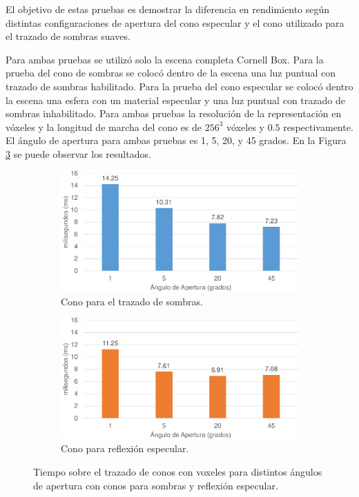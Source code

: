 El objetivo de estas pruebas es demostrar la diferencia en rendimiento según distintas configuraciones de apertura del cono especular y el cono utilizado para el trazado de sombras suaves.

Para ambas pruebas se utilizó solo la escena completa Cornell Box. Para la prueba del cono de sombras se colocó dentro de la escena una luz puntual con trazado de sombras habilitado. Para la prueba del cono especular se colocó dentro la escena una esfera con un material especular y una luz puntual con trazado de sombras inhabilitado. Para ambas pruebas la resolución de la representación en vóxeles y la longitud de marcha del cono es de $256^3$ vóxeles y $0.5$ respectivamente. El ángulo de apertura para ambas pruebas es 1, 5, 20, y 45 grados. En la Figura \ref{fig:fine_cones} se puede observar los resultados.

\begin{figure}[H]
	\centering
	\begin{subfigure}[b]{.5\linewidth}
		\centering
		\includegraphics[width=\linewidth]{media/shadowcone_aperture_cropped.pdf}
		\caption*{Cono para el trazado de sombras.}
		\label{fig:shadowcone_aperture}
	\end{subfigure}%
	\begin{subfigure}[b]{.5\linewidth}
		\centering
		\includegraphics[width=\linewidth]{media/specularcone_aperture_cropped.pdf}
		\caption{Cono para reflexión especular.}
		\label{fig:specularcone_aperture}
	\end{subfigure}%
	\caption{Tiempo sobre el trazado de conos con voxeles para distintos ángulos de apertura con conos para sombras y reflexión especular.}
	\label{fig:fine_cones}
\end{figure}

